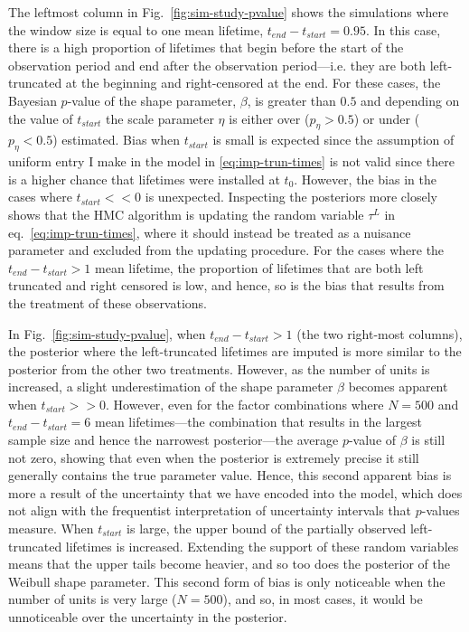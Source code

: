 The leftmost column in Fig.~\ref{fig:sim-study-pvalue} shows the simulations where the window size is equal to one mean lifetime, $t_{end} - t_{start} = 0.95$. In this case, there is a high proportion of lifetimes that begin before the start of the observation period and end after the observation period---i.e. they are both left-truncated at the beginning and right-censored at the end. For these cases, the Bayesian $p$-value of the shape parameter, $\beta$, is greater than $0.5$ and depending on the value of $t_{start}$ the scale parameter $\eta$ is either over ($p_{\eta} > 0.5$) or under ($p_{\eta} < 0.5$) estimated. Bias when $t_{start}$ is small is expected since the assumption of uniform entry I make in the model in \eqref{eq:imp-trun-times} is not valid since there is a higher chance that lifetimes were installed at $t_0$. However, the bias in the cases where $t_{start} << 0$ is unexpected. Inspecting the posteriors more closely shows that the HMC algorithm is updating the random variable $\tau^L$ in eq.~\eqref{eq:imp-trun-times}, where it should instead be treated as a nuisance parameter and excluded from the updating procedure. For the cases where the $t_{end} - t_{start} > 1$ mean lifetime, the proportion of lifetimes that are both left truncated and right censored is low, and hence, so is the bias that results from the treatment of these observations. 

In Fig.~\ref{fig:sim-study-pvalue}, when $t_{end} - t_{start} > 1$ (the two right-most columns), the posterior where the left-truncated lifetimes are imputed is more similar to the posterior from the other two treatments. However, as the number of units is increased, a slight underestimation of the shape parameter $\beta$ becomes apparent when $t_{start} >> 0$. However, even for the factor combinations where $N = 500$ and $t_{end} - t_{start} = 6$ mean lifetimes---the combination that results in the largest sample size and hence the narrowest posterior---the average $p$-value of $\beta$ is still not zero, showing that even when the posterior is extremely precise it still generally contains the true parameter value. Hence, this second apparent bias is more a result of the uncertainty that we have encoded into the model, which does not align with the frequentist interpretation of uncertainty intervals that $p$-values measure. When $t_{start}$ is large, the upper bound of the partially observed left-truncated lifetimes is increased. Extending the support of these random variables means that the upper tails become heavier, and so too does the posterior of the Weibull shape parameter. This second form of bias is only noticeable when the number of units is very large ($N = 500$), and so, in most cases, it would be unnoticeable over the uncertainty in the posterior.

